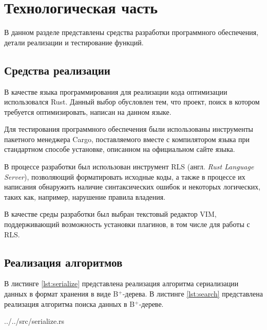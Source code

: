 \chapter{Технологическая часть}

В данном разделе представлены средства разработки программного обеспечения, детали реализации и тестирование функций.

\section{Средства реализации}

В качестве языка программирования для реализации кода оптимизации использовался Rust\cite{rust}. Данный выбор обусловлен тем, что проект, поиск в котором требуется оптимизировать, написан на данном языке.

Для тестирования программного обеспечения были использованы инструменты пакетного менеджера Cargo\cite{cargo}, поставляемого вместе с компилятором языка при стандартном способе установке, описанном на официальном сайте языка\cite{rust}. 

В процессе разработки был использован инструмент RLS\cite{rls} (англ. \textit{Rust Language Server}), позволяющий форматировать исходные коды, а также в процессе их написания обнаружить наличие синтаксических ошибок и некоторых логических, таких как, например, нарушение правила владения\cite{rust-learn}.

В качестве среды разработки был выбран текстовый редактор VIM\cite{vim}, поддерживающий возможность установки плагинов\cite{vim-plugins}, в том числе для работы с RLS\cite{rls}.

\section{Реализация алгоритмов}

В листинге \ref{lst:serialize} представлена реализация алгоритма сериализации данных в формат хранения в виде B$^+$-дерева. В листинге \ref{lst:search} представлена реализация алгоритма поиска данных в B$^+$-дереве.

\begin{lstinputlisting}[
        caption={Реализация алгоритма сериализации данных},
        label={lst:serialize},
        style={rust}
    ]{../../src/serialize.rs}
\end{lstinputlisting}

